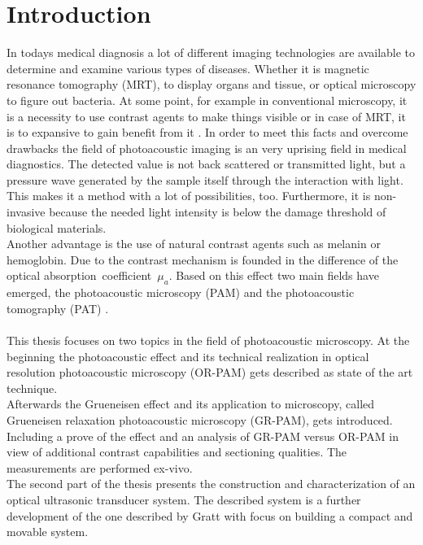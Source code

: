 \section{Introduction}

In todays medical diagnosis a lot of different imaging technologies are available to determine and examine various types of diseases. Whether it is magnetic resonance tomography (MRT), to display organs and tissue, or optical microscopy to figure out bacteria. At some point, for example in conventional microscopy, it is a necessity to use contrast agents to make things visible or in case of MRT, it is to expansive to gain benefit from it \cite{grun:integrating}. In order to meet this facts and overcome drawbacks the field of photoacoustic imaging is an very uprising field in medical diagnostics. The detected value is not back scattered or transmitted light, but a pressure wave generated by the sample itself through the interaction with light. This makes it a method with a lot of possibilities, too. Furthermore, it is non-invasive because the needed light intensity is below the damage threshold of biological materials. \\
Another advantage is the use of natural contrast agents such as melanin or hemoglobin. Due to the contrast mechanism is founded in the difference of the optical absorption~coefficient~$\mu_a$. Based on this effect two main fields have emerged, the photoacoustic microscopy (PAM) and the photoacoustic tomography (PAT) \cite{YAO201487}. \\
\\
This thesis focuses on two topics in the field of photoacoustic microscopy. At the beginning the photoacoustic effect and its technical realization in optical resolution photoacoustic microscopy (OR-PAM) gets described as state of the art technique. \\
Afterwards the Grueneisen effect and its application to microscopy, called Grueneisen relaxation photoacoustic microscopy (GR-PAM), gets introduced. Including a prove of the effect and an analysis of GR-PAM versus OR-PAM in view of additional contrast capabilities and sectioning qualities. The measurements are performed ex-vivo.\\
The second part of the thesis presents the construction and characterization of an optical ultrasonic transducer system. The described system is a further development of the one described by Gratt \cite{GrattSibylle:Dis} with focus on building a compact and movable system.\\

